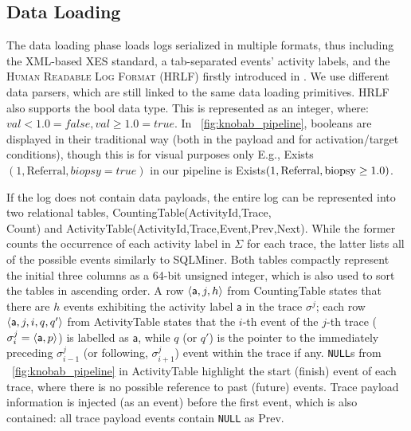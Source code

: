 \subsection{Data Loading}\label{ssec:dl}
The data loading phase   loads logs  serialized in multiple  formats, thus including the XML-based XES standard, a tab-separated events' activity labels, and the \textsc{Human Readable Log Format} (HRLF) firstly introduced in \cite{bpm21}. We use different data parsers, which are still linked to the same data loading primitives.   
{HRLF also supports the \textsf{bool} data type. This is represented as an integer, where: $val < 1.0 = false,  val \ge 1.0 = true$. In \figurename~\ref{fig:knobab_pipeline}, \textsf{booleans} are displayed in their traditional way (both in the payload and for activation/target conditions), though this is for visual purposes only E.g., \textsf{Exists}$(1,\textrm{Referral},biopsy = true)$ in our pipeline is \textsf{Exists}$(1,\textrm{Referral},\textup{biopsy}\ge 1.0)$.}

If the log does not contain data payloads, the entire log can be represented into two relational tables, \textsf{CountingTable(ActivityId,Trace,\\Count)} and \textsf{ActivityTable(ActivityId,Trace,Event,Prev,Next)}. While the former counts the occurrence of each activity label in $\Sigma$ for each trace, the latter lists all of the possible events similarly to SQLMiner. Both tables compactly represent the initial three columns as a 64-bit unsigned integer, which is also used to sort the tables in ascending order. A row $\braket{\textsf{a},j,h}$ from \textsf{CountingTable} states that there are $h$ events exhibiting the activity label $\textsf{a}$ in the trace $\sigma^j$; each row $\braket{\textsf{a},j,i,q,q'}$ from \textsf{ActivityTable} states that the $i$-th event of the $j$-th trace ($\sigma^j_i=\braket{\textsf{a},p}$) is labelled as $\textsf{a}$, while $q$ (or $q'$) is the pointer to the immediately preceding $\sigma^j_{i-1}$ (or  following, $\sigma^j_{i+1}$) event within the trace if any. \texttt{NULL}s from  \figurename~\ref{fig:knobab_pipeline} in \textsf{ActivityTable} highlight the start (finish) event of each trace, where there is no possible reference to past (future) events. Trace payload information is injected (as an event) before the first event, which is also contained:  all trace payload events contain \texttt{NULL} as \textsf{Prev}. %


